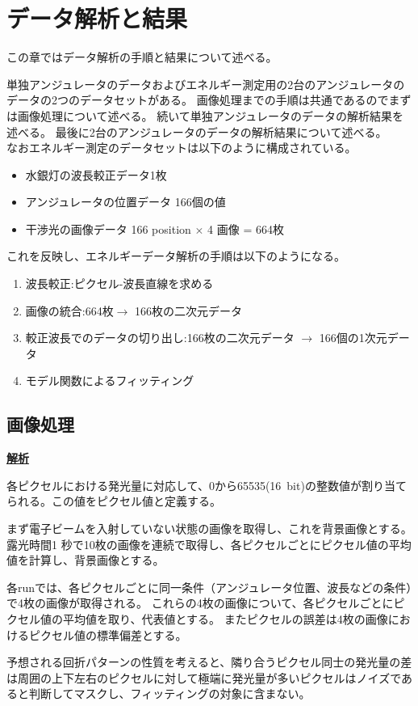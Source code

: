 \documentclass[a4paper,11pt,uplatex]{jsbook}
\begin{document}
\chapter{データ解析と結果}
この章ではデータ解析の手順と結果について述べる。

単独アンジュレータのデータおよびエネルギー測定用の2台のアンジュレータのデータの2つのデータセットがある。
画像処理までの手順は共通であるのでまずは画像処理について述べる。
続いて単独アンジュレータのデータの解析結果を述べる。
最後に2台のアンジュレータのデータの解析結果について述べる。\\
なおエネルギー測定のデータセットは以下のように構成されている。
\begin{itemize}
  \item 水銀灯の波長較正データ1枚
  \item アンジュレータの位置データ 166個の値
  \item 干渉光の画像データ 166 position $\times$ 4 画像 = 664枚
\end{itemize}
これを反映し、エネルギーデータ解析の手順は以下のようになる。
\begin{enumerate}
  \item 波長較正:ピクセル-波長直線を求める
  \item 画像の統合:664枚$\rightarrow$ 166枚の二次元データ
  \item 較正波長でのデータの切り出し:166枚の二次元データ $\rightarrow$ 166個の1次元データ
  \item モデル関数によるフィッティング
\end{enumerate}

\section{画像処理}
\noindent \textbf{\underline{解析}}\par
各ピクセルにおける発光量に対応して、0から65535(16~bit)の整数値が割り当てられる。この値をピクセル値と定義する。

まず電子ビームを入射していない状態の画像を取得し、これを背景画像とする。露光時間1 秒で10枚の画像を連続で取得し、各ピクセルごとにピクセル値の平均値を計算し、背景画像とする。

各runでは、各ピクセルごとに同一条件（アンジュレータ位置、波長などの条件）で4枚の画像が取得される。
これらの4枚の画像について、各ピクセルごとにピクセル値の平均値を取り、代表値とする。
またピクセルの誤差は4枚の画像におけるピクセル値の標準偏差とする。

予想される回折パターンの性質を考えると、隣り合うピクセル同士の発光量の差は周囲の上下左右のピクセルに対して極端に発光量が多いピクセルはノイズであると判断してマスクし、フィッティングの対象に含まない。
\end{document}
